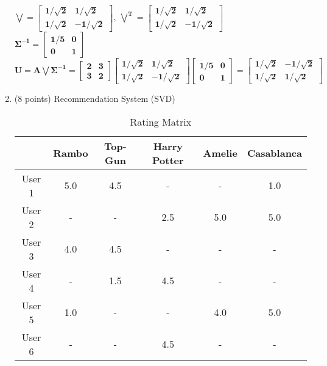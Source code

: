 \documentclass{article}%
\begin{document}
\begin{enumerate}
    $\mathbf{ \bigvee = \begin{bmatrix} 1/\sqrt2 & 1/\sqrt2 \\ 1/\sqrt2 & -1/\sqrt2 \end{bmatrix}, \ \bigvee^T = \begin{bmatrix} 1/\sqrt2 & 1/\sqrt2 \\ 1/\sqrt2 & -1/\sqrt2 \end{bmatrix} }$ \\
    $\mathbf{ \Sigma^{-1} = \begin{bmatrix} 1/5 & 0 \\ 0 & 1 \end{bmatrix}}$ \\
    $\mathbf{ U = A \bigvee \Sigma^{-1} =  \begin{bmatrix} 2 & 3 \\ 3 & 2 \end{bmatrix} \begin{bmatrix} 1/\sqrt2 & 1/\sqrt2 \\ 1/\sqrt2 & -1/\sqrt2 \end{bmatrix} \begin{bmatrix} 1/5 & 0 \\ 0 & 1 \end{bmatrix} = \begin{bmatrix} 1/\sqrt2 & -1/\sqrt2 \\ 1/\sqrt2 & 1/\sqrt2 \end{bmatrix} }$

    
    \item (8 points) Recommendation System (SVD)
    
    \begin{table}[!ht]
        \centering
        \begin{tabular}{|c|c|c|c|c|c|}
             \toprule
              & Rambo & Top-Gun & Harry Potter& Amelie & Casablanca \\\hline
             User 1&5.0&4.5&-&-&1.0\\\hline
             User 2&-&-&2.5&5.0&5.0\\\hline
             User 3&4.0&4.5&-&-&-\\\hline
             User 4&-&1.5&4.5&-&-\\\hline
             User 5&1.0&-&-&4.0&5.0\\\hline
             User 6&-&-&4.5&-&-\\ \hline
        \end{tabular}
        \caption{Rating Matrix}
        \label{tab:rating matrix}
    \end{table}
    

\end{enumerate}
\end{document}
